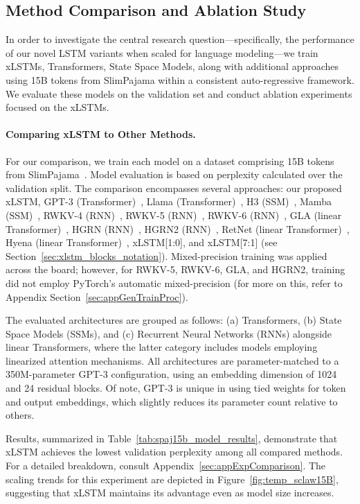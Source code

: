 \subsection{Method Comparison and Ablation Study}
\label{sec:ExpComparison}

In order to investigate the central research question—specifically, the performance of our novel LSTM variants when scaled for language modeling—we train xLSTMs, Transformers, State Space Models, along with additional approaches using 15B tokens from SlimPajama within a consistent auto-regressive framework. We evaluate these models on the validation set and conduct ablation experiments focused on the xLSTMs.

\paragraph{Comparing xLSTM to Other Methods.} For our comparison, we train each model on a dataset comprising 15B tokens from SlimPajama~\citep{Soboleva:23}. Model evaluation is based on perplexity calculated over the validation split. The comparison encompasses several approaches: our proposed xLSTM, GPT-3 (Transformer)~\citep{Brown:20short}, Llama (Transformer)~\citep{Touvron:23arxiv}, H3 (SSM)~\citep{Fu:23}, Mamba (SSM)~\citep{Gu:24arxiv}, RWKV-4 (RNN)~\citep{Peng:23arxivshort}, RWKV-5 (RNN)~\citep{Peng:24arxivshort}, RWKV-6 (RNN)~\citep{Peng:24arxivshort}, GLA (linear Transformer)~\citep{Yang:23arxiv}, HGRN (RNN)~\citep{Qin:23}, HGRN2 (RNN)~\citep{Qin:24arxiv}, RetNet (linear Transformer)~\citep{Sun:23arxiv}, Hyena (linear Transformer)~\citep{Poli:23}, xLSTM[1:0], and xLSTM[7:1] (see Section~\ref{sec:xlstm_blocks_notation}). Mixed-precision training was applied across the board; however, for RWKV-5, RWKV-6, GLA, and HGRN2, training did not employ PyTorch's automatic mixed-precision (for more on this, refer to Appendix Section~\ref{sec:appGenTrainProc}).

The evaluated architectures are grouped as follows: (a) Transformers, (b) State Space Models (SSMs), and (c) Recurrent Neural Networks (RNNs) alongside linear Transformers, where the latter category includes models employing linearized attention mechanisms. All architectures are parameter-matched to a 350M-parameter GPT-3 configuration, using an embedding dimension of 1024 and 24 residual blocks. Of note, GPT-3 is unique in using tied weights for token and output embeddings, which slightly reduces its parameter count relative to others. 

Results, summarized in Table~\ref{tab:spaj15b_model_results}, demonstrate that xLSTM achieves the lowest validation perplexity among all compared methods. For a detailed breakdown, consult Appendix~\ref{sec:appExpComparison}. The scaling trends for this experiment are depicted in Figure~\ref{fig:temp_sclaw15B}, suggesting that xLSTM maintains its advantage even as model size increases.

